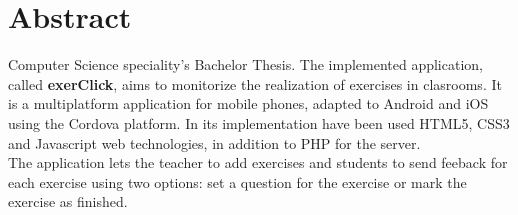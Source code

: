 \section*{Abstract}

Computer Science speciality's Bachelor Thesis. The implemented application, called \textbf{exerClick}, aims to monitorize the realization of exercises in clasrooms. It is a multiplatform application for mobile phones, adapted to Android and iOS using the Cordova \cite{apachecordova} platform. In its implementation have been used HTML5, CSS3 and Javascript web technologies, in addition to PHP for the server.\\

The application lets the teacher to add exercises and students to send feeback for each exercise using two options: set a question for the exercise or mark the exercise as finished.\\